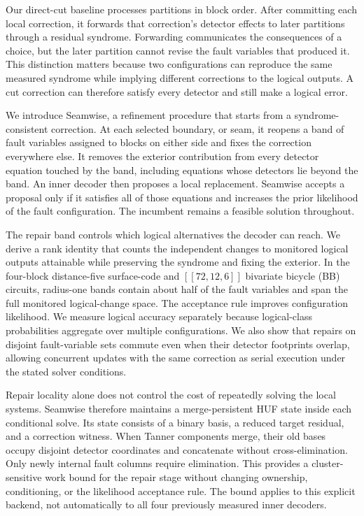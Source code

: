 \documentclass[10pt,letterpaper,twocolumn]{article}
\begin{document}
Our direct-cut baseline processes partitions in block order. After committing each local correction, it forwards that correction's detector effects to later partitions through a residual syndrome. Forwarding communicates the consequences of a choice, but the later partition cannot revise the fault variables that produced it. This distinction matters because two configurations can reproduce the same measured syndrome while implying different corrections to the logical outputs. A cut correction can therefore satisfy every detector and still make a logical error.

We introduce Seamwise, a refinement procedure that starts from a syndrome-consistent correction. At each selected boundary, or seam, it reopens a band of fault variables assigned to blocks on either side and fixes the correction everywhere else. It removes the exterior contribution from every detector equation touched by the band, including equations whose detectors lie beyond the band. An inner decoder then proposes a local replacement. Seamwise accepts a proposal only if it satisfies all of those equations and increases the prior likelihood of the fault configuration. The incumbent remains a feasible solution throughout.

The repair band controls which logical alternatives the decoder can reach. We derive a rank identity that counts the independent changes to monitored logical outputs attainable while preserving the syndrome and fixing the exterior. In the four-block distance-five surface-code and $[[72,12,6]]$ bivariate bicycle (BB) circuits, radius-one bands contain about half of the fault variables and span the full monitored logical-change space. The acceptance rule improves configuration likelihood. We measure logical accuracy separately because logical-class probabilities aggregate over multiple configurations. We also show that repairs on disjoint fault-variable sets commute even when their detector footprints overlap, allowing concurrent updates with the same correction as serial execution under the stated solver conditions.

Repair locality alone does not control the cost of repeatedly solving the local systems. Seamwise therefore maintains a merge-persistent HUF state inside each conditional solve. Its state consists of a binary basis, a reduced target residual, and a correction witness. When Tanner components merge, their old bases occupy disjoint detector coordinates and concatenate without cross-elimination. Only newly internal fault columns require elimination. This provides a cluster-sensitive work bound for the repair stage without changing ownership, conditioning, or the likelihood acceptance rule. The bound applies to this explicit backend, not automatically to all four previously measured inner decoders.
\end{document}
